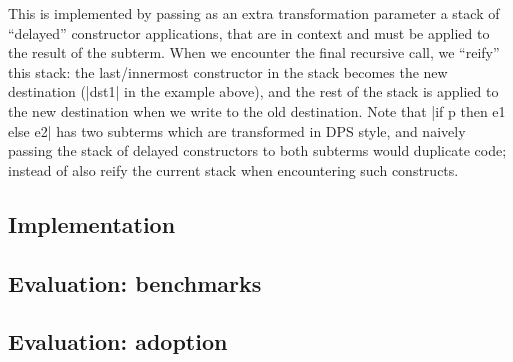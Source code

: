 This is implemented by passing as an extra transformation parameter a stack of ``delayed'' constructor applications, that are in context and must be applied to the result of the subterm. When we encounter the final recursive call, we ``reify'' this stack: the last/innermost constructor in the stack becomes the new destination (\ocaml|dst1| in the example above), and the rest of the stack is applied to the new destination when we write to the old destination. Note that \ocaml|if p then e1 else e2| has two subterms which are transformed in DPS style, and naively passing the stack of delayed constructors to both subterms would duplicate code; instead of also reify the current stack when encountering such constructs.

\subsection{Implementation}

\subsection{Evaluation: benchmarks}

\subsection{Evaluation: adoption}



